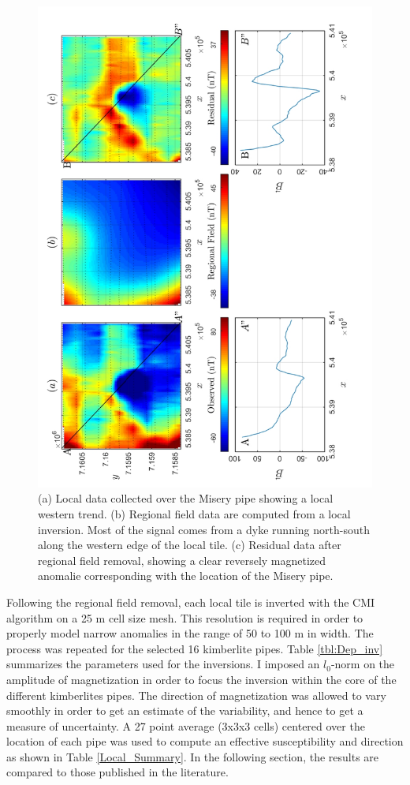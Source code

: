 \begin{figure}[h]
\centering
\includegraphics[scale=0.55,angle=270]{RegRem_Misery}
\caption{(a) Local data collected over the Misery pipe showing a local western trend. (b) Regional field data are computed from a local inversion. Most of the signal comes from a dyke running north-south along the western edge of the local tile. (c) Residual data after regional field removal, showing a clear reversely magnetized anomalie corresponding with the location of the Misery pipe.}
\label{fig:RegRem_Misery}
\end{figure}

Following the regional field removal, each local tile is inverted with the CMI algorithm on a 25 m cell size mesh.
This resolution is required in order to properly model narrow anomalies in the range of 50 to 100 m in width.
The process was repeated for the selected 16 kimberlite pipes.
Table \ref{tbl:Dep_inv} summarizes the parameters used for the inversions.
I imposed an $l_0$-norm on the amplitude of magnetization in order to focus the inversion within the core of the different kimberlites pipes. The direction of magnetization was allowed to vary smoothly in order to get an estimate of the variability, and hence to get a measure of uncertainty. A 27 point average (3x3x3 cells) centered over the location of each pipe was used to compute an effective susceptibility and direction as shown in Table \ref{Local_Summary}.
In the following section, the results are compared to those published in the literature.


